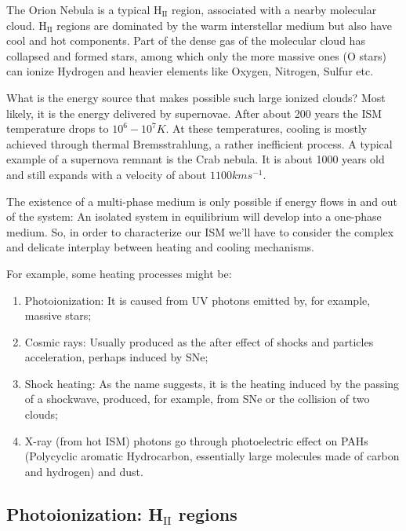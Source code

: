 The Orion Nebula is a typical H$_{\text{II}}$ region, associated with a nearby molecular cloud. H$_{\text{II}}$ regions are dominated by the warm interstellar medium but also have cool and hot components. Part of the dense gas of the molecular cloud has collapsed and formed stars, among which only the more massive ones (O stars) can ionize Hydrogen and heavier elements like Oxygen, Nitrogen, Sulfur etc.
\par What is the energy source that makes possible such large ionized clouds? Most likely, it is the energy delivered by supernovae. After about 200 years the ISM temperature drops to $10^{6}-10^{7}\unit{K}$. At these temperatures, cooling is mostly achieved through thermal Bremsstrahlung, a rather inefficient process. A typical example of a supernova remnant is the Crab nebula. It is about 1000 years old and still expands with a velocity of about $1100\unit{km}\unit{s}^{-1}$.
\par The existence of a multi-phase medium is only possible if energy flows in and out of the system: An isolated system in equilibrium will develop into a one-phase medium. So, in order to characterize our ISM we'll have to consider the complex and delicate interplay between heating and cooling mechanisms.
\par For example, some heating processes might be:
\begin{enumerate}
    \item Photoionization: It is caused from UV photons emitted by, for example, massive stars;
    \item Cosmic rays: Usually produced as the after effect of shocks and particles acceleration, perhaps induced by SNe;
    \item Shock heating: As the name suggests, it is the heating induced by the passing of a shockwave, produced, for example, from SNe or the collision of two clouds;
    \item X-ray (from hot ISM) photons go through photoelectric  effect on PAHs (Polycyclic aromatic Hydrocarbon, essentially large molecules made of carbon and hydrogen) and dust.
\end{enumerate}

\subsection{Photoionization: H$_{\text{II}}$ regions}

